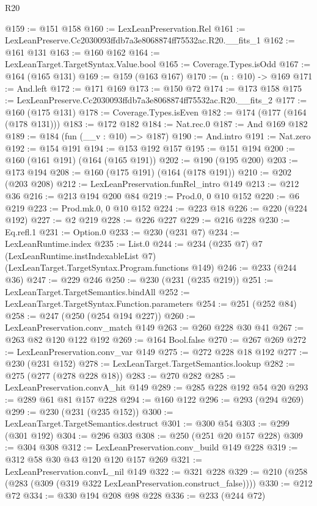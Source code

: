 \begin{lexlean}{R20}
\begin{coremodule}
@159 := @151 @158
@160 := LexLeanPreservation.Rel
@161 := LexLeanPreserve.Cc2030093ffdb7a3e8068874ff75532ac.R20.__fits_1
@162 := @161 @131
@163 := @160 @162
@164 := LexLeanTarget.TargetSyntax.Value.bool
@165 := Coverage.Types.isOdd
@167 := @164 (@165 @131)
@169 := @159 (@163 @167)
@170 := (n : @10) -> @169
@171 := And.left
@172 := @171 @169
@173 := @150 @72
@174 := @173 @158
@175 := LexLeanPreserve.Cc2030093ffdb7a3e8068874ff75532ac.R20.__fits_2
@177 := @160 (@175 @131)
@178 := Coverage.Types.isEven
@182 := @174 (@177 (@164 (@178 @131)))
@183 := @172 @182
@184 := Nat.rec.{0}
@187 := And @169 @182
@189 := @184 (fun (__v : @10) => @187)
@190 := And.intro
@191 := Nat.zero
@192 := @154 @191
@194 := @153 @192 @157
@195 := @151 @194
@200 := @160 (@161 @191) (@164 (@165 @191))
@202 := @190 (@195 @200)
@203 := @173 @194
@208 := @160 (@175 @191) (@164 (@178 @191))
@210 := @202 (@203 @208)
@212 := LexLeanPreservation.funRel_intro @149
@213 := @212 @36
@216 := @213 @194 @200 @84
@219 := Prod.{0, 0} @10 @152
@220 := @6 @219
@223 := Prod.mk.{0, 0} @10 @152
@224 := @223 @18
@226 := @220 (@224 @192)
@227 := @2 @219
@228 := @226 @227
@229 := @216 @228
@230 := Eq.refl.{1}
@231 := Option.{0}
@233 := @230 (@231 @7)
@234 := LexLeanRuntime.index
@235 := List.{0}
@244 := @234
    (@235 @7)
    @7
    (LexLeanRuntime.instIndexableList @7)
    (LexLeanTarget.TargetSyntax.Program.functions @149)
@246 := @233 (@244 @36)
@247 := @229 @246
@250 := @230 (@231 (@235 @219))
@251 := LexLeanTarget.TargetSemantics.bindAll
@252 := LexLeanTarget.TargetSyntax.Function.parameters
@254 := @251 (@252 @84)
@258 := @247 (@250 (@254 @194 @227))
@260 := LexLeanPreservation.conv_match @149
@263 := @260 @228 @30 @41
@267 := @263 @82 @120 @122 @192
@269 := @164 Bool.false
@270 := @267 @269
@272 := LexLeanPreservation.conv_var @149
@275 := @272 @228 @18 @192
@277 := @230 (@231 @152)
@278 := LexLeanTarget.TargetSemantics.lookup
@282 := @275 (@277 (@278 @228 @18))
@283 := @270 @282
@285 := LexLeanPreservation.convA_hit @149
@289 := @285 @228 @192 @54 @20
@293 := @289 @61 @81 @157 @228
@294 := @160 @122
@296 := @293 (@294 @269)
@299 := @230 (@231 (@235 @152))
@300 := LexLeanTarget.TargetSemantics.destruct
@301 := @300 @54
@303 := @299 (@301 @192)
@304 := @296 @303
@308 := @250 (@251 @20 @157 @228)
@309 := @304 @308
@312 := LexLeanPreservation.conv_build @149 @228
@319 := @312 @58 @30 @43 @120 @120 @157 @269
@321 := LexLeanPreservation.convL_nil @149
@322 := @321 @228
@329 := @210 (@258 (@283 (@309 (@319 @322 LexLeanPreservation.construct_false))))
@330 := @212 @72
@334 := @330 @194 @208 @98 @228
@336 := @233 (@244 @72)

\end{coremodule}
\end{lexlean}
